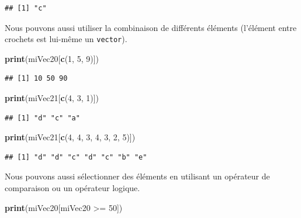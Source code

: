 \documentclass[twoside,symmetric]{book}
\newenvironment{Shaded}{}{}
\newcommand{\DecValTok}[1]{#1}
\newcommand{\KeywordTok}[1]{\textbf{#1}}
\newcommand{\NormalTok}[1]{#1}
\newcommand{\OperatorTok}[1]{#1}
\newcommand{\StringTok}[1]{#1}
\begin{document}
\begin{verbatim}
## [1] "c"
\end{verbatim}

Nous pouvons aussi utiliser la combinaison de différents éléments (l'élément entre crochets est lui-même un \texttt{vector}).

\begin{Shaded}
\begin{Highlighting}[]
\KeywordTok{print}\NormalTok{(miVec20[}\KeywordTok{c}\NormalTok{(}\DecValTok{1}\NormalTok{, }\DecValTok{5}\NormalTok{, }\DecValTok{9}\NormalTok{)])}
\end{Highlighting}
\end{Shaded}

\begin{verbatim}
## [1] 10 50 90
\end{verbatim}

\begin{Shaded}
\begin{Highlighting}[]
\KeywordTok{print}\NormalTok{(miVec21[}\KeywordTok{c}\NormalTok{(}\DecValTok{4}\NormalTok{, }\DecValTok{3}\NormalTok{, }\DecValTok{1}\NormalTok{)])}
\end{Highlighting}
\end{Shaded}

\begin{verbatim}
## [1] "d" "c" "a"
\end{verbatim}

\begin{Shaded}
\begin{Highlighting}[]
\KeywordTok{print}\NormalTok{(miVec21[}\KeywordTok{c}\NormalTok{(}\DecValTok{4}\NormalTok{, }\DecValTok{4}\NormalTok{, }\DecValTok{3}\NormalTok{, }\DecValTok{4}\NormalTok{, }\DecValTok{3}\NormalTok{, }\DecValTok{2}\NormalTok{, }\DecValTok{5}\NormalTok{)])}
\end{Highlighting}
\end{Shaded}

\begin{verbatim}
## [1] "d" "d" "c" "d" "c" "b" "e"
\end{verbatim}

Nous pouvons aussi sélectionner des éléments en utilisant un opérateur de comparaison ou un opérateur logique.

\begin{Shaded}
\begin{Highlighting}[]
\KeywordTok{print}\NormalTok{(miVec20[miVec20 }\OperatorTok{>=}\StringTok{ }\DecValTok{50}\NormalTok{])}
\end{Highlighting}
\end{Shaded}
\end{document}
